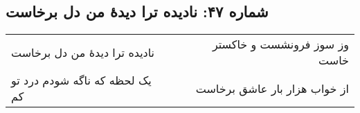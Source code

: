 \begin{center}
\section*{شماره ۴۷: نادیده ترا دیدۀ من دل برخاست}
\label{sec:047}
\begin{longtable}{l p{0.5cm} r}
نادیده ترا دیدهٔ من دل برخاست
&&
وز سوز فرونشست و خاکستر خاست
\\
یک لحظه که ناگه شودم درد تو کم
&&
از خواب هزار بار عاشق برخاست
\\
\end{longtable}
\end{center}
